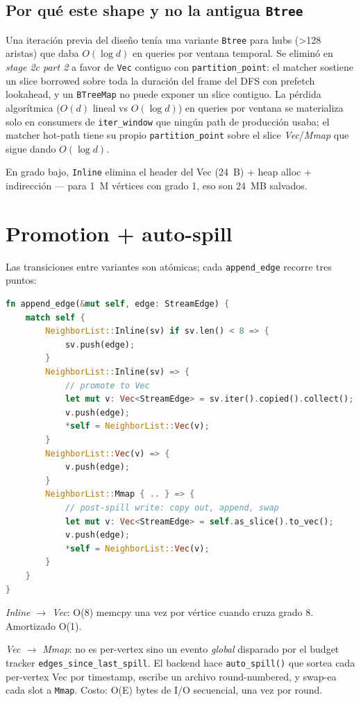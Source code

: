 \subsection{Por qué este shape y no la antigua \texttt{Btree}}

Una iteración previa del diseño tenía una variante \texttt{Btree}
para hubs (>128 aristas) que daba \(O(\log d)\) en queries por
ventana temporal. Se eliminó en \emph{stage 2c part 2} a favor de
\texttt{Vec} contiguo con \texttt{partition\_point}: el matcher
sostiene un slice borrowed sobre toda la duración del frame del DFS
con prefetch lookahead, y un \texttt{BTreeMap} no puede exponer un
slice contiguo. La pérdida algorítmica (\(O(d)\) lineal vs
\(O(\log d)\)) en queries por ventana se materializa solo en
consumers de \texttt{iter\_window} que ningún path de producción
usaba; el matcher hot-path tiene su propio \texttt{partition\_point}
sobre el slice \emph{Vec}/\emph{Mmap} que sigue dando \(O(\log d)\).

En grado bajo, \texttt{Inline} elimina el header del Vec (24~B)
+ heap alloc + indirección — para 1~M vértices con grado 1, eso son
24~MB salvados.

\section{Promotion + auto-spill}

Las transiciones entre variantes son atómicas; cada \texttt{append\_edge}
recorre tres puntos:

\begin{lstlisting}[language=Rust]
fn append_edge(&mut self, edge: StreamEdge) {
    match self {
        NeighborList::Inline(sv) if sv.len() < 8 => {
            sv.push(edge);
        }
        NeighborList::Inline(sv) => {
            // promote to Vec
            let mut v: Vec<StreamEdge> = sv.iter().copied().collect();
            v.push(edge);
            *self = NeighborList::Vec(v);
        }
        NeighborList::Vec(v) => {
            v.push(edge);
        }
        NeighborList::Mmap { .. } => {
            // post-spill write: copy out, append, swap
            let mut v: Vec<StreamEdge> = self.as_slice().to_vec();
            v.push(edge);
            *self = NeighborList::Vec(v);
        }
    }
}
\end{lstlisting}

\noindent
\emph{Inline \(\to\) Vec}: O(8) memcpy una vez por vértice cuando
cruza grado 8. Amortizado O(1).

\emph{Vec \(\to\) Mmap}: no es per-vertex sino un evento
\emph{global} disparado por el budget tracker
\texttt{edges\_since\_last\_spill}. El backend hace \texttt{auto\_spill()}
que sortea cada per-vertex Vec por timestamp, escribe un archivo
round-numbered, y swap-ea cada slot a \texttt{Mmap}. Costo: O(E)
bytes de I/O secuencial, una vez por round.

